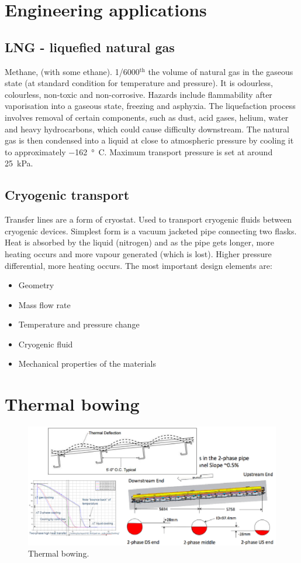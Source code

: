 \section{Engineering applications}
\subsection{LNG - liquefied natural gas}
Methane,  (with some ethane). 1/6000$^{\textrm{th}}$ the volume of natural gas in the gaseous state (at standard condition for temperature and pressure). It is odourless, colourless, non-toxic and non-corrosive. Hazards include flammability after vaporisation into a gaseous state, freezing and asphyxia. The liquefaction process involves removal of certain components, such as dust, acid gases, helium, water and heavy hydrocarbons, which could cause difficulty downstream. The natural gas is then condensed into a liquid at close to atmospheric pressure by cooling it to approximately \SI{-162}{\degree C}. Maximum transport pressure is set at around \SI{25}{\kilo\pascal}.
\subsection{Cryogenic transport}
Transfer lines are a form of cryostat. Used to transport cryogenic fluids between cryogenic devices. Simplest form is a vacuum jacketed pipe connecting two flasks. Heat is absorbed by the liquid (nitrogen) and as the pipe gets longer, more heating occurs and more vapour generated (which is lost). Higher pressure differential, more heating occurs. The most important design elements are:
\begin{itemize}
    \item Geometry
    \item Mass flow rate
    \item Temperature and pressure change
    \item Cryogenic fluid
    \item Mechanical properties of the materials
\end{itemize}
\section{Thermal bowing}
\begin{figure}[H]
    \centering
    \includegraphics[width = \textwidth]{img/figure59.png}
    \caption{Thermal bowing.}
\end{figure}
